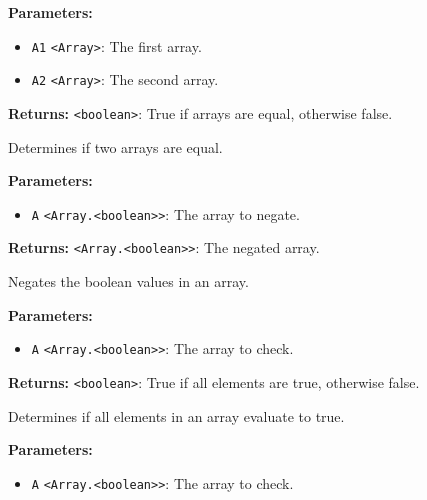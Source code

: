 \documentclass[12pt,a4paper]{article}
\begin{document}
\noindent \textbf{Parameters:}
\begin{itemize}
  \item \texttt{A1} \texttt{<Array>}: The first array.
  \item \texttt{A2} \texttt{<Array>}: The second array.
\end{itemize}

\noindent \textbf{Returns:} \texttt{<boolean>}: True if arrays are equal, otherwise false.

\noindent Determines if two arrays are equal.

\vspace{5mm}
\noindent {}


\noindent \textbf{Parameters:}
\begin{itemize}
  \item \texttt{A} \texttt{<Array.<boolean>>}: The array to negate.
\end{itemize}

\noindent \textbf{Returns:} \texttt{<Array.<boolean>>}: The negated array.

\noindent Negates the boolean values in an array.

\vspace{5mm}
\noindent {}


\noindent \textbf{Parameters:}
\begin{itemize}
  \item \texttt{A} \texttt{<Array.<boolean>>}: The array to check.
\end{itemize}

\noindent \textbf{Returns:} \texttt{<boolean>}: True if all elements are true, otherwise false.

\noindent Determines if all elements in an array evaluate to true.

\vspace{5mm}
\noindent {}


\noindent \textbf{Parameters:}
\begin{itemize}
  \item \texttt{A} \texttt{<Array.<boolean>>}: The array to check.
\end{itemize}
\end{document}
